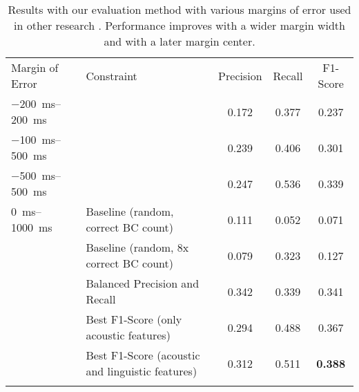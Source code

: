 \begin{table}
    \centering
    \begin{tabular}{p{3.1cm}p{6cm}ccc}
    \hline\noalign{\smallskip}
        Margin of Error & Constraint & Precision & Recall & F1-Score \\
        \noalign{\smallskip}\svhline\noalign{\smallskip}
        \SIrange{-200}{200}{ms} && 0.172 & 0.377 & 0.237 \\
        \SIrange{-100}{500}{ms} &&	0.239 & 0.406 & 0.301 \\
        \SIrange{-500}{500}{ms} && 0.247 & 0.536 & 0.339 \\
    \hline\noalign{\smallskip}
        \SIrange{0}{1000}{ms} & Baseline (random, correct BC count) & 0.111 & 0.052 & 0.071 \\
         & Baseline (random, 8x correct BC count) & 0.079 & 0.323 & 0.127 \\
         & Balanced Precision and Recall & 0.342 & 0.339 & 0.341 \\
         & Best F1-Score \newline (only acoustic features) & 0.294 & 0.488 & 0.367 \\
         & Best F1-Score \newline (acoustic and linguistic features) & 0.312 & 0.511 & \bf{0.388} \\
    \noalign{\smallskip}\hline\noalign{\smallskip}
    \end{tabular}
    \caption{Results with our evaluation method with various margins of error used in other research \cite{de_kok_survey_2012}. Performance improves with a wider margin width and with a later margin center.\label{tbl:ourbest}}
\end{table}
